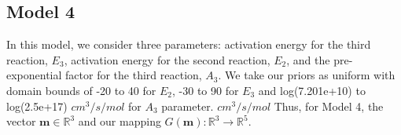 \subsection{Model 4}


 In this model, we consider three parameters: activation energy for
 the third reaction, $E_3$,
 activation energy for the second reaction, $E_2$, and the pre-exponential
 factor for the third reaction, $A_3$. We take our priors as uniform
 with domain bounds of -20 to 40 for $E_2$, -30 to 90 for $E_3$ and
 log(7.201e+10) to log(2.5e+17) $cm^3/s/mol$ for $A_3$ parameter. $cm^3/s/mol$
Thus, for Model 4, the vector
 $\mathbf{m} \in \mathbb{R}^3$ and our mapping $G(\mathbf{m}):
\mathbb{R}^3 \rightarrow \mathbb{R}^5$.










